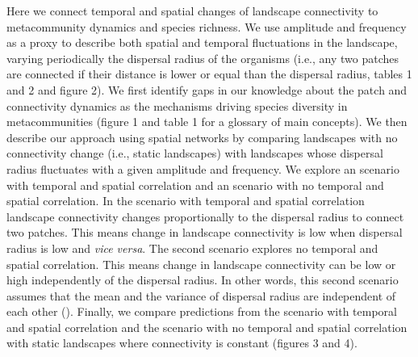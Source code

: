 \documentclass[12pt]{article}
\begin{document}
    Here we connect temporal and spatial changes of landscape connectivity to metacommunity dynamics and species richness. We use amplitude and frequency as a proxy to describe both spatial and temporal fluctuations in the landscape, varying periodically the dispersal radius of the organisms (i.e., any two patches are connected if their distance is lower or equal than the dispersal radius, tables 1 and 2 and figure 2). We first identify gaps in our knowledge about the patch and connectivity dynamics as the mechanisms driving species diversity in metacommunities (figure 1 and table 1 for a glossary of main concepts). We then describe our approach using spatial networks by comparing landscapes with no connectivity change (i.e., static landscapes) with landscapes whose dispersal radius fluctuates with a given amplitude and frequency. We explore an scenario with temporal and spatial correlation and an scenario with no temporal and spatial correlation. In the scenario with temporal and spatial correlation landscape connectivity changes proportionally to the dispersal radius to connect two patches. This means change in landscape connectivity is low when dispersal radius is low and \emph{vice versa}. The second scenario explores no temporal and spatial correlation. This means change in landscape connectivity can be low or high independently of the dispersal radius. In other words, this second scenario assumes that the mean and the variance of dispersal radius are independent of each other (\cite{Violletal2012}). Finally, we compare predictions from the scenario with temporal and spatial correlation and the scenario with no temporal and spatial correlation with static landscapes where connectivity is constant (figures 3 and 4). 
    
\end{document}
